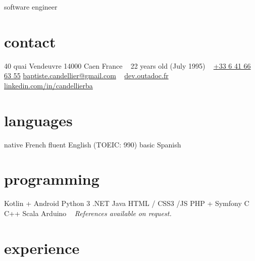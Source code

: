 \documentclass[]{friggeri-cv}
\begin{document}
{software engineer}

\begin{aside}
    \section{contact}
    40 quai Vendeuvre
    14000 Caen
    France
    ~
    22 years old (July 1995)
    ~
    \href{tel:0033641666355}{+33 6 41 66 63 55}
    \href{mailto:baptiste.candellier@gmail.com}{baptiste.candellier@gmail.com}
    ~
    {\href{https://dev.outadoc.fr}{dev.outadoc.fr}}
    {\href{https://www.linkedin.com/in/candellierba/}{linkedin.com/in/candellierba}}
    \section{languages}
    native French
    fluent English (TOEIC: 990)
    basic Spanish
    \section{programming}
    Kotlin + Android 
    Python 3 
    \csharp{} .NET 
    Java 
    HTML / CSS3 /JS 
    PHP + Symfony 
    C 
    C++ 
    Scala 
    Arduino 
    ~
    \textit{References available}
    \textit{on request.}
    \restorecr 
    \obeycr
\end{aside}

\section{experience}
\end{document}
